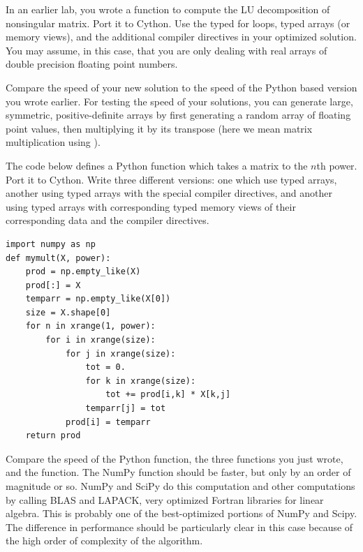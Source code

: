 \begin{problem}
In an earlier lab, you wrote a function to compute the LU decomposition of nonsingular matrix.
Port it to Cython.
Use the typed for loops, typed arrays (or memory views), and the additional compiler directives in your optimized solution.
You may assume, in this case, that you are only dealing with real arrays of double precision floating point numbers.

Compare the speed of your new solution to the speed of the Python based version you wrote earlier.
For testing the speed of your solutions, you can generate large, symmetric, positive-definite arrays by first generating a random array of floating point values, then multiplying it by its transpose (here we mean matrix multiplication using ).
\end{problem}

\begin{problem}
The code below defines a Python function which takes a matrix to the $n$th power.
Port it to Cython. Write three different versions: one which use typed arrays, another using typed arrays with the special compiler directives, and another using typed arrays with corresponding typed memory views of their corresponding data and the compiler directives.
\begin{lstlisting}
import numpy as np
def mymult(X, power):
    prod = np.empty_like(X)
    prod[:] = X
    temparr = np.empty_like(X[0])
    size = X.shape[0]
    for n in xrange(1, power):
        for i in xrange(size):
            for j in xrange(size):
                tot = 0.
                for k in xrange(size):
                    tot += prod[i,k] * X[k,j]
                temparr[j] = tot
            prod[i] = temparr
    return prod
\end{lstlisting}

Compare the speed of the Python function, the three functions you just wrote, and the  function.
The NumPy function should be faster, but only by an order of magnitude or so.
NumPy and SciPy do this computation and other computations by calling BLAS and LAPACK, very optimized Fortran libraries for linear algebra.
This is probably one of the best-optimized portions of NumPy and Scipy.
The difference in performance should be particularly clear in this case because of the high order of complexity of the algorithm.
\end{problem}


